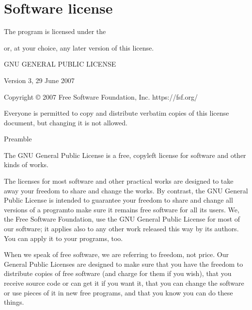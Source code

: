 \documentclass[letterpaper,10pt,english]{sphinxmanual}
\begin{document}
\chapter{Software license}
\label{\detokenize{04-appendix/license_enroute:software-license}}\label{\detokenize{04-appendix/license_enroute::doc}}
\sphinxAtStartPar
The program  is licensed under the %
\begin{footnote}[18]\sphinxAtStartFootnote
{}
%
\end{footnote} or,
at your choice, any later version of this license.

\begin{sphinxVerbatim}[commandchars=\\\{\}]
 GNU GENERAL PUBLIC LICENSE

 Version 3, 29 June 2007

 Copyright © 2007 Free Software Foundation, Inc. \PYGZlt{}https://fsf.org/\PYGZgt{}

 Everyone is permitted to copy and distribute verbatim copies of this license
 document, but changing it is not allowed.

 Preamble

   The GNU General Public License is a free, copyleft license for software and
   other kinds of works.

   The licenses for most software and other practical works are designed to
   take away your freedom to share and change the works. By contrast, the GNU
   General Public License is intended to guarantee your freedom to share and
   change all versions of a program\PYGZhy{}\PYGZhy{}to make sure it remains free software for
   all its users. We, the Free Software Foundation, use the GNU General Public
   License for most of our software; it applies also to any other work released
   this way by its authors. You can apply it to your programs, too.

   When we speak of free software, we are referring to freedom, not price. Our
   General Public Licenses are designed to make sure that you have the freedom
   to distribute copies of free software (and charge for them if you wish),
   that you receive source code or can get it if you want it, that you can
   change the software or use pieces of it in new free programs, and that you
   know you can do these things.


\end{sphinxVerbatim}
\end{document}

